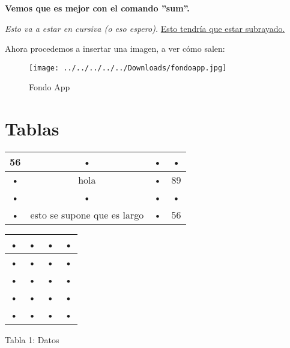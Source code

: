 \documentclass[10pt,a4paper]{article}
\begin{document}
\textbf{Vemos que es mejor con el comando ''sum''.}

\textit{Esto va a estar en cursiva (o eso espero).}
\underline{Esto tendría que estar subrayado.}

\pagebreak
Ahora procedemos a insertar una imagen, a ver cómo salen:
\begin{figure}[hbtp]
\centering
\texttt{[image: ../../../../../Downloads/fondoapp.jpg]}
\caption{Fondo App}
\end{figure}

\section{Tablas}
\begin{center}
\begin{tabular}{|c|c|c|c|}
\hline 
56 & • & • & • \\ 
\hline 
• & hola & • & 89 \\ 
\hline 
• & • & • & • \\ 
\hline 
• & esto se supone que es largo & • & 56 \\ 
\hline 
\end{tabular} 
\end{center}

\begin{center}
\begin{tabular}{c|c|c|c}
\hline 
• & • & • & • \\ 
\hline 
• & • & • & • \\ 
\hline 
• & • & • & • \\ 
\hline 
• & • & • & • \\ 
\hline 
• & • & • & • \\ 
\hline 
\end{tabular}\bigskip

Tabla 1: Datos
\end{center}
\end{document}
